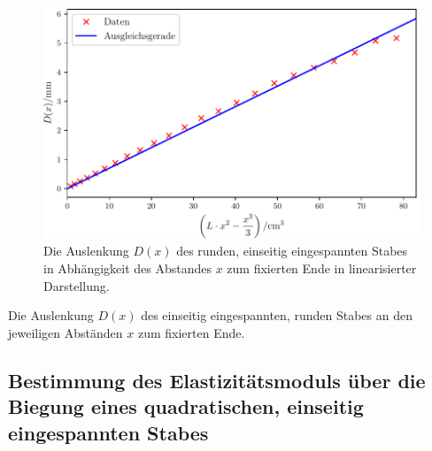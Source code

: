 \begin{figure}
	\centering
	\includegraphics[scale=.8]{content/images/StabRundEinseitig2.pdf}
	\caption{Die Auslenkung $D(x)$ des runden, einseitig eingespannten Stabes in Abhängigkeit des Abstandes $x$ zum fixierten Ende in linearisierter Darstellung.}
	\label{fig:rundlinear}
\end{figure}
\begin{table}
	\caption{Die Auslenkung $D(x)$ des einseitig eingespannten, runden Stabes an den jeweiligen Abständen $x$ zum fixierten Ende.}
	\begin{minipage}{0.5\textwidth}
		\centering
		
	\end{minipage}
	\begin{minipage}{0.5\textwidth}
		\centering
		
	\end{minipage}
\end{table}

\subsection{Bestimmung des Elastizitätsmoduls über die Biegung eines quadratischen, einseitig eingespannten Stabes}\label{subsec:QuadratischEinseitig}

